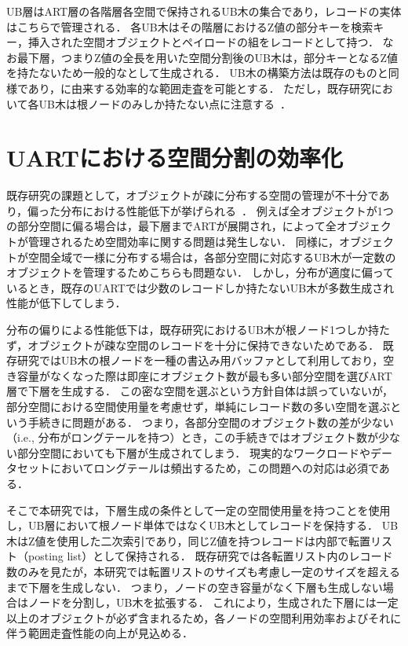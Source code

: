 UB層はART層の各階層各空間で保持されるUB木の集合であり，レコードの実体はこちらで管理される．
各UB木はその階層におけるZ値の部分キーを検索キー，挿入された空間オブジェクトとペイロードの組をレコードとして持つ．
なお最下層，つまりZ値の全長を用いた空間分割後のUB木は，部分キーとなるZ値を持たないため一般的な\BTree{}として生成される．
UB木の構築方法は既存のものと同様であり，\BTree{}に由来する効率的な範囲走査を可能とする．
ただし，既存研究において各UB木は根ノードのみしか持たない点に注意する~\cite{deim:Suzuki2023}．





\chapter{UARTにおける空間分割の効率化}

既存研究の課題として，オブジェクトが疎に分布する空間の管理が不十分であり，偏った分布における性能低下が挙げられる~\cite{deim:Suzuki2023}．
例えば全オブジェクトが1つの部分空間に偏る場合は，最下層までARTが展開され，\BTree{}によって全オブジェクトが管理されるため空間効率に関する問題は発生しない．
同様に，オブジェクトが空間全域で一様に分布する場合は，各部分空間に対応するUB木が一定数のオブジェクトを管理するためこちらも問題ない．
しかし，分布が適度に偏っているとき，既存のUARTでは少数のレコードしか持たないUB木が多数生成され性能が低下してしまう．

分布の偏りによる性能低下は，既存研究におけるUB木が根ノード1つしか持たず，オブジェクトが疎な空間のレコードを十分に保持できないためである．
既存研究ではUB木の根ノードを一種の書込み用バッファとして利用しており，空き容量がなくなった際は即座にオブジェクト数が最も多い部分空間を選びART層で下層を生成する．
この密な空間を選ぶという方針自体は誤っていないが，部分空間における空間使用量を考慮せず，単純にレコード数の多い空間を選ぶという手続きに問題がある．
つまり，各部分空間のオブジェクト数の差が少ない（i.e., 分布がロングテールを持つ）とき，この手続きではオブジェクト数が少ない部分空間においても下層が生成されてしまう．
現実的なワークロードやデータセットにおいてロングテールは頻出するため，この問題への対応は必須である．

そこで本研究では，下層生成の条件として一定の空間使用量を持つことを使用し，UB層において根ノード単体ではなくUB木としてレコードを保持する．
UB木はZ値を使用した二次索引であり，同じZ値を持つレコードは内部で転置リスト（posting list）として保持される．
既存研究では各転置リスト内のレコード数のみを見たが，本研究では転置リストのサイズも考慮し一定のサイズを超えるまで下層を生成しない．
つまり，ノードの空き容量がなく下層も生成しない場合はノードを分割し，UB木を拡張する．
これにより，生成された下層には一定以上のオブジェクトが必ず含まれるため，各ノードの空間利用効率およびそれに伴う範囲走査性能の向上が見込める．





